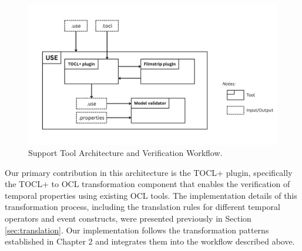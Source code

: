 \begin{figure}
    \centering
    \includegraphics[width=1\textwidth]{figures/c3/Architecture_overview.png}
    \caption{Support Tool Architecture and Verification Workflow.}
    \label{sec:plugin_support_tool_architecture}
\end{figure}

Our primary contribution in this architecture is the TOCL+ plugin, specifically 
the TOCL+ to OCL transformation component that enables the verification of temporal 
properties using existing OCL tools. The implementation details of this transformation 
process, including the translation rules for different temporal operators and event 
constructs, were presented previously in Section \ref{sec:translation}. Our implementation 
follows the transformation patterns established in Chapter 2 and integrates them into 
the workflow described above.



